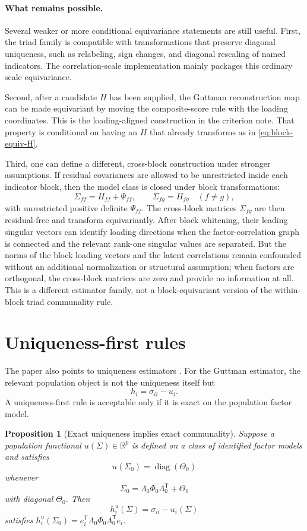 \documentclass[11pt]{article}
\newcommand{\T}{^{\mathsf T}}
\newcommand{\diag}{\operatorname{diag}}
\theoremstyle{plain}
\newtheorem{proposition}{Proposition}
\theoremstyle{remark}
\begin{document}
\paragraph{What remains possible.}
Several weaker or more conditional equivariance statements are still useful.
First, the triad family is compatible with transformations that preserve
diagonal uniqueness, such as relabeling, sign changes, and diagonal rescaling
of named indicators. The correlation-scale implementation mainly packages this
ordinary scale equivariance.

Second, after a candidate \(H\) has been supplied, the Guttman reconstruction
map can be made equivariant by moving the composite-score rule with the loading
coordinates. This is the loading-aligned construction in the criterion note.
That property is conditional on having an \(H\) that already transforms as in
\eqref{eq:block-equiv-H}.

Third, one can define a different, cross-block construction under stronger
assumptions. If residual covariances are allowed to be unrestricted inside each
indicator block, then the model class is closed under block transformations:
\[
  \Sigma_{ff}=H_{ff}+\Psi_{ff},\qquad
  \Sigma_{fg}=H_{fg}\quad(f\ne g),
\]
with unrestricted positive definite \(\Psi_{ff}\). The cross-block matrices
\(\Sigma_{fg}\) are then residual-free and transform equivariantly. After
block whitening, their leading singular vectors can identify loading
directions when the factor-correlation graph is connected and the relevant
rank-one singular values are separated. But the norms of the block loading
vectors and the latent correlations remain confounded without an additional
normalization or structural assumption; when factors are orthogonal, the
cross-block matrices are zero and provide no information at all. This is a
different estimator family, not a block-equivariant version of the
within-block triad communality rule.

\section{Uniqueness-first rules}

The paper also points to uniqueness estimators \cite{iharakano1986,cudeck1991}.
For the Guttman estimator, the relevant population object is not the uniqueness
itself but
\[
  h_i=\sigma_{ii}-u_i .
\]
A uniqueness-first rule is acceptable only if it is exact on the population
factor model.

\begin{proposition}[Exact uniqueness implies exact communality]
\label{prop:uniqueness}
Suppose a population functional \(u(\Sigma)\in\mathbb R^p\) is defined on a
class of identified factor models and satisfies
\[
  u(\Sigma_0)=\diag(\Theta_0)
\]
whenever
\[
  \Sigma_0=\Lambda_0\Phi_0\Lambda_0\T+\Theta_0
\]
with diagonal \(\Theta_0\). Then
\[
  h_i^u(\Sigma)=\sigma_{ii}-u_i(\Sigma)
\]
satisfies \(h_i^u(\Sigma_0)=e_i\T\Lambda_0\Phi_0\Lambda_0\T e_i\).
\end{proposition}
\end{document}
